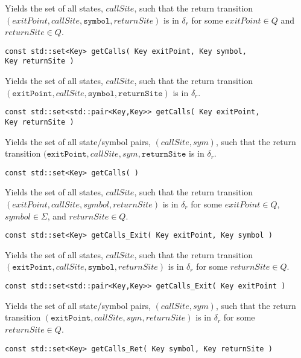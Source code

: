 \begin{description}
    Yields the set of all states, $callSite$, such that the return transition
    $(exitPoint,callSite,\texttt{symbol},returnSite)$ is in $\delta_r$ for
    some $exitPoint \in Q$ and $returnSite \in Q$.

  \item\texttt{const std::set<Key> getCalls( Key exitPoint, Key symbol,\\ \hspace*{3.25cm} Key returnSite )} \nopagebreak

    Yields the set of all states, $callSite$, such that the return transition
    $(\texttt{exitPoint},callSite,\texttt{symbol},\texttt{returnSite})$ is in
    $\delta_r$.

  \item\texttt{const std::set<std::pair<Key,Key>> getCalls( Key exitPoint,\\ \hspace*{3.25cm} Key returnSite )} \nopagebreak

    Yields the set of all state/symbol pairs, $(callSite,sym)$, such that the
    return transition $(\texttt{exitPoint},callSite,sym,\texttt{returnSite}$
    is in $\delta_r$.

  \item\texttt{const std::set<Key> getCalls( )} \nopagebreak

    Yields the set of all states, $callSite$, such that the return transition
    $(exitPoint,callSite,symbol,returnSite)$ is in $\delta_r$ for some
    $exitPoint \in Q$, $symbol \in \Sigma$, and $returnSite \in Q$.

  \item\texttt{const std::set<Key> getCalls\_Exit( Key exitPoint, Key symbol )} \nopagebreak

    Yields the set of all states, $callSite$, such that the return transition
    $(\texttt{exitPoint},callSite,\texttt{symbol},returnSite)$ is in
    $\delta_r$ for some $returnSite \in Q$.

  \item\texttt{const std::set<std::pair<Key,Key>> getCalls\_Exit( Key exitPoint )} \nopagebreak

    Yields the set of all state/symbol pairs, $(callSite,sym)$, such that the
    return transition $(\texttt{exitPoint},callSite,sym,returnSite)$ is in
    $\delta_r$ for some $returnSite \in Q$.

  \item\texttt{const std::set<Key> getCalls\_Ret( Key symbol, Key returnSite )} \nopagebreak


\end{description}
